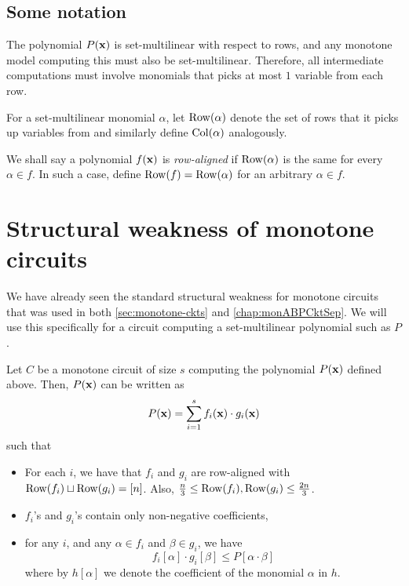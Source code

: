 \subsection*{Some notation}

The polynomial $P(\mathbf{x})$ is set-multilinear with respect to rows, and any monotone model computing this must also be set-multilinear. Therefore, all intermediate computations must involve monomials that picks at most $1$ variable from each row.

For a set-multilinear monomial $\alpha$, let $\operatorname{Row}(\alpha)$ denote the set of rows that it picks up variables from and similarly define $\operatorname{Col}(\alpha)$ analogously.

We shall say a polynomial $f(\mathbf{x})$ is \emph{row-aligned} if $\operatorname{Row}(\alpha)$ is the same for every $\alpha \in f$. In such a case, define $\operatorname{Row}(f) = \operatorname{Row}(\alpha)$ for an arbitrary $\alpha \in f$. \\


\section{Structural weakness of monotone circuits}

We have already seen the standard structural weakness for monotone circuits that was used in both \autoref{sec:monotone-ckts} and \autoref{chap:monABPCktSep}. We will use this specifically for a circuit computing a set-multilinear polynomial such as $P$.

\begin{lemma}\label{lem:monVPVNP:structure}
  Let $C$ be a monotone circuit of size $s$ computing the polynomial $P(\mathbf{x})$ defined above. Then, $P(\mathbf{x})$ can be written as
  \begin{equation}\label{eqn:monVPVNP-main}
    P(\mathbf{x}) = \sum_{i=1}^s f_i(\mathbf{x}) \cdot g_i(\mathbf{x})
  \end{equation}
  such that
  \begin{itemize}\itemsep 0pt
  \item For each $i$, we have that $f_i$ and $g_i$ are row-aligned with
    $\operatorname{Row}(f_i) \sqcup \operatorname{Row}(g_i) = [n]$. Also, $\frac{n}{3} \leq \operatorname{Row}(f_i), \operatorname{Row}(g_i) \leq \frac{2n}{3}$.
  \item $f_i$'s and $g_i$'s contain only non-negative coefficients,
  \item for any $i$, and any $\alpha \in f_i$ and $\beta\in g_i$, we have
    \[
      f_i[\alpha]\cdot g_i[\beta] \leq P[\alpha \cdot \beta]
    \]
    where by $h[\alpha]$ we denote the coefficient of the monomial $\alpha$ in $h$.
  \end{itemize}
\end{lemma}

